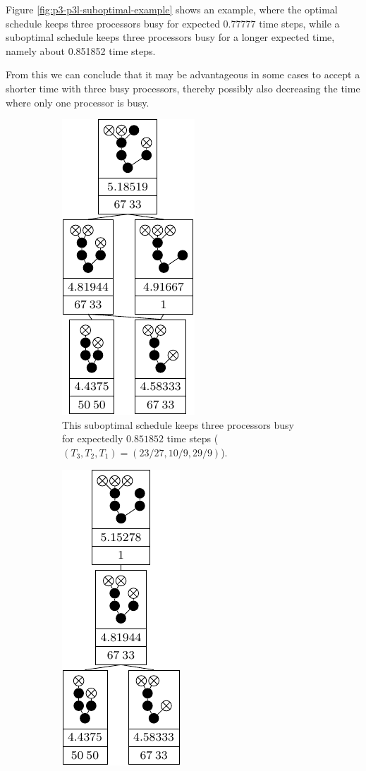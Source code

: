 Figure \ref{fig:p3-p3l-suboptimal-example} shows an example, where the optimal schedule keeps three processors busy for expected 0.77777 time steps, while a suboptimal schedule keeps three processors busy for a longer expected time, namely about 0.851852 time steps.

From this we can conclude that it may be advantageous in some cases to accept a shorter time with three busy processors, thereby possibly also decreasing the time where only one processor is busy.

\begin{figure}[ht]
  \centering
  \begin{subfigure}{.45\linewidth}
    \centering
    \includegraphics{p3/keep_3_busy/three_busy_subopt.pdf}
    \caption{This suboptimal schedule keeps three processors busy for expectedly $0.851852$ time steps ($(T_3, T_2, T_1)=(23/27,10/9,29/9)$).}
  \end{subfigure}
  \quad
  \begin{subfigure}{.45\linewidth}
    \centering
    \includegraphics{p3/keep_3_busy/three_busy_opt.pdf}

\end{subfigure}
\end{figure}
